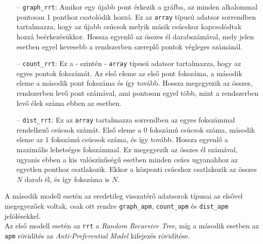 \begin{itemize}
    \item[--] \texttt{graph\_rrt}: Amikor egy újabb pont érkezik a gráfba, az minden alkalommal pontosan 1 ponthoz csatolódik hozzá. Ez az \texttt{array} típusú adatsor sorrendben tartalmazza, hogy az újabb csúcsok melyik másik csúcshoz kapcsolódtak hozzá beérkezésükkor. Hossza egyenlő az összes él darabszámával, mely jelen esetben egyel kevesebb a rendszerben szereplő pontok végleges számánál.
    \item[--] \texttt{count\_rrt}: Ez a - szintén - \texttt{array} típusú adatsor tartalmazza, hogy az egyes pontok fokszámát. Az első eleme az első pont fokszáma, a második eleme a második pont fokszáma és így tovább. Hossza megegyezik az összes, rendszerben levő pont számával, ami pontosan egyel több, mint a rendszerben levő élek száma ebben az esetben.
    \item[--] \texttt{dist\_rrt}: Ez az \texttt{array} tartalmazza sorrendben az egyes fokszámmal rendelkező csúcsok számát. Első eleme a $0$ fokszámú csúcsok száma, második eleme az $1$ fokszámú csúcsok száma, és így tovább. Hossza egyenlő a maximális lehetséges fokszámmal. Ez megegyezik az összes él számával, ugyanis ebben a kis valószínűségű esetben minden csúcs ugyanahhoz az egyetlen ponthoz csatlakozik. Ekkor a központi csúcshoz csatlakozik az összes $N$ darab él, és így fokszáma is $N$.
\end{itemize}
A második modell esetén az eredetileg visszatérő adatsorok típusai az elsővel megegyezőek voltak, csak ott rendre \texttt{graph\_apm}, \texttt{count\_apm} és \texttt{dist\_apm} jelölésekkel. \\
Az első modell esetén az \texttt{rrt} a \emph{Random Recursive Tree}, míg a második esetben az \texttt{apm} rövidítés az \emph{Anti-Preferential Model} kifejezés rövidítése.


